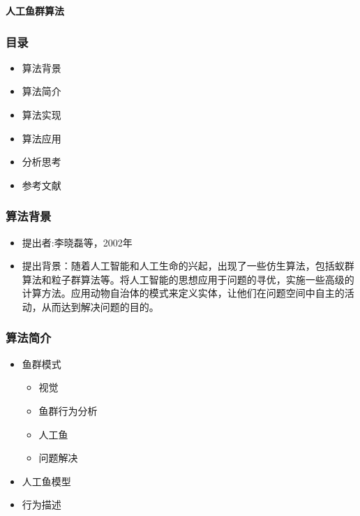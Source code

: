 
\begin{frame}
\newcommand{\song}{\setCJKfamilyfont{song}}
\newcommand{\xiaoer}{\fontsize{18pt}{18pt}\selectfont}
	\begin{center}
	{\song\xiaoer\textbf{人工鱼群算法}}
	\end{center}
\end{frame}

\begin{frame}
	\frametitle{目录}
	\begin{itemize}
		\item{算法背景}
		\item{算法简介}
		\item{算法实现}
		\item{算法应用}
		\item{分析思考}
		\item{参考文献}

	\end{itemize}
\end{frame}

\begin{frame}
	\frametitle{算法背景}
	\begin{itemize}
		\item{提出者:李晓磊等，2002年}
		\item{提出背景：随着人工智能和人工生命的兴起，出现了一些仿生算法，包括蚁群算法和粒子群算法等。将人工智能的思想应用于问题的寻优，实施一些高级的计算方法。应用动物自治体的模式来定义实体，让他们在问题空间中自主的活动，从而达到解决问题的目的。}
	\end{itemize}
\end{frame}

\begin{frame}
	\frametitle{算法简介}
	\begin{itemize}
		\item{鱼群模式}
			\begin{itemize}
				\item{视觉}
				\item{鱼群行为分析}
				\item{人工鱼}
				\item{问题解决}
			\end{itemize}
		\item{人工鱼模型}
		\item{行为描述}
	\end{itemize}
\end{frame}

